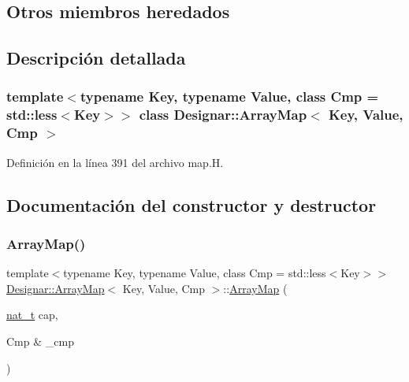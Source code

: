 \subsection*{Otros miembros heredados}


\subsection{Descripción detallada}
\subsubsection*{template$<$typename Key, typename Value, class Cmp = std\+::less$<$\+Key$>$$>$\newline
class Designar\+::\+Array\+Map$<$ Key, Value, Cmp $>$}



Definición en la línea 391 del archivo map.\+H.



\subsection{Documentación del constructor y destructor}
\mbox{\label{class_designar_1_1_array_map_aa08404c6d0b6d40d7aefd04ccea24bc5}} 
\subsubsection{\texorpdfstring{Array\+Map()}{ArrayMap()}\hspace{0.1cm}{\footnotesize\ttfamily [1/6]}}
{\footnotesize\ttfamily template$<$typename Key, typename Value, class Cmp = std\+::less$<$\+Key$>$$>$ \\
\hyperlink{class_designar_1_1_array_map}{Designar\+::\+Array\+Map}$<$ Key, Value, Cmp $>$\+::\hyperlink{class_designar_1_1_array_map}{Array\+Map} (\begin{DoxyParamCaption}\item[{\hyperlink{namespace_designar_aa72662848b9f4815e7bf31a7cf3e33d1}{nat\+\_\+t}}]{cap,  }\item[{Cmp \&}]{\+\_\+cmp }\end{DoxyParamCaption})\hspace{0.3cm}{\ttfamily [inline]}}




